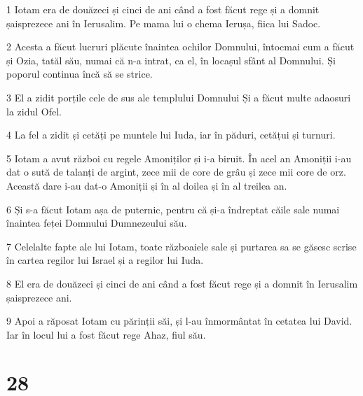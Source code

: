 \par 1 Iotam era de douăzeci și cinci de ani când a fost făcut rege și a domnit șaisprezece ani în Ierusalim. Pe mama lui o chema Ierușa, fiica lui Sadoc.
\par 2 Acesta a făcut lucruri plăcute înaintea ochilor Domnului, întocmai cum a făcut și Ozia, tatăl său, numai că n-a intrat, ca el, în locașul sfânt al Domnului. Și poporul continua încă să se strice.
\par 3 El a zidit porțile cele de sus ale templului Domnului Și a făcut multe adaosuri la zidul Ofel.
\par 4 La fel a zidit și cetăți pe muntele lui Iuda, iar în păduri, cetățui și turnuri.
\par 5 Iotam a avut război cu regele Amoniților și i-a biruit. În acel an Amoniții i-au dat o sută de talanți de argint, zece mii de core de grâu și zece mii core de orz. Această dare i-au dat-o Amoniții și în al doilea și în al treilea an.
\par 6 Și s-a făcut Iotam așa de puternic, pentru că și-a îndreptat căile sale numai înaintea feței Domnului Dumnezeului său.
\par 7 Celelalte fapte ale lui Iotam, toate războaiele sale și purtarea sa se găsesc scrise în cartea regilor lui Israel și a regilor lui Iuda.
\par 8 El era de douăzeci și cinci de ani când a fost făcut rege și a domnit în Ierusalim șaisprezece ani.
\par 9 Apoi a răposat Iotam cu părinții săi, și l-au înmormântat în cetatea lui David. Iar în locul lui a fost făcut rege Ahaz, fiul său.

\chapter{28}

